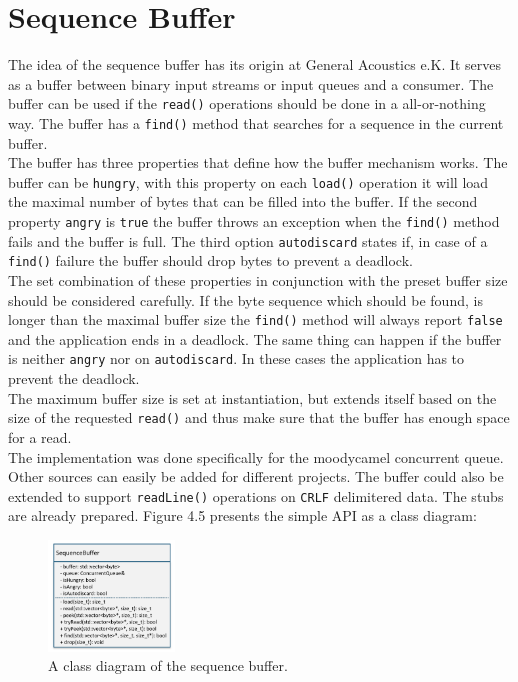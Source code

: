 \section{Sequence Buffer}
The idea of the sequence buffer has its origin at General Acoustics e.K. It serves as a buffer between binary input streams or input queues and a consumer. The buffer can be used if the \texttt{read()} operations should be done in a all-or-nothing way. The buffer has a \texttt{find()} method that searches for a sequence in the current buffer.\\
The buffer has three properties that define how the buffer mechanism works. The buffer can be \texttt{hungry}, with this property on each \texttt{load()} operation it will load the maximal number of bytes that can be filled into the buffer. If the second property \texttt{angry} is \texttt{true} the buffer throws an exception when the \texttt{find()} method fails and the buffer is full. The third option \texttt{autodiscard} states if, in case of a  \texttt{find()} failure the buffer should drop bytes to prevent a deadlock.\\
The set combination of these properties in conjunction with the preset buffer size should be considered carefully. If the byte sequence which should be found, is longer than the maximal buffer size the \texttt{find()} method will always report \texttt{false} and the application ends in a deadlock. The same thing can happen if the buffer is neither \texttt{angry} nor on \texttt{autodiscard}. In these cases the application has to prevent the deadlock.\\
The maximum buffer size is set at instantiation, but extends itself based on the size of the requested \texttt{read()} and thus make sure that the buffer has enough space for a read.\\
The implementation was done specifically for the moodycamel concurrent queue. Other sources can easily be added for different projects. The buffer could also be extended to support \texttt{readLine()} operations on \texttt{CRLF} delimitered data. The stubs are already prepared. Figure 4.5 presents the simple API as a class diagram:
\begin{figure}[ht]
\centering
      \includegraphics[width=0.3\textwidth]{seqbuf}
        \caption{A class diagram of the sequence buffer.}
\end{figure}

